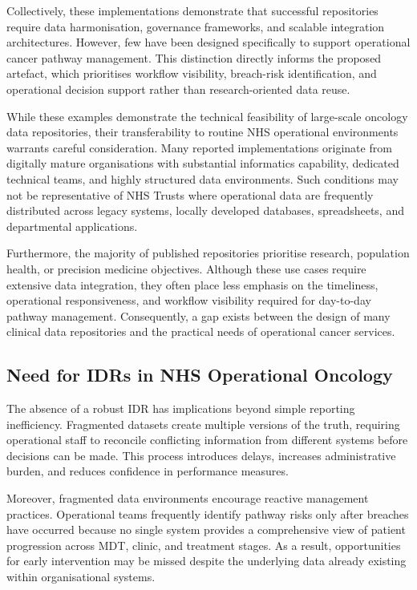 Collectively, these implementations demonstrate that successful repositories require data harmonisation, governance frameworks, and scalable integration architectures. However, few have been designed specifically to support operational cancer pathway management. This distinction directly informs the proposed artefact, which prioritises workflow visibility, breach-risk identification, and operational decision support rather than research-oriented data reuse.

While these examples demonstrate the technical feasibility of large-scale oncology data repositories, their transferability to routine NHS operational environments warrants careful consideration. Many reported implementations originate from digitally mature organisations with substantial informatics capability, dedicated technical teams, and highly structured data environments. Such conditions may not be representative of NHS Trusts where operational data are frequently distributed across legacy systems, locally developed databases, spreadsheets, and departmental applications.

Furthermore, the majority of published repositories prioritise research, population health, or precision medicine objectives. Although these use cases require extensive data integration, they often place less emphasis on the timeliness, operational responsiveness, and workflow visibility required for day-to-day pathway management. Consequently, a gap exists between the design of many clinical data repositories and the practical needs of operational cancer services.


\subsection{Need for IDRs in NHS Operational Oncology}

The absence of a robust IDR has implications beyond simple reporting inefficiency. Fragmented datasets create multiple versions of the truth, requiring operational staff to reconcile conflicting information from different systems before decisions can be made. This process introduces delays, increases administrative burden, and reduces confidence in performance measures.

Moreover, fragmented data environments encourage reactive management practices. Operational teams frequently identify pathway risks only after breaches have occurred because no single system provides a comprehensive view of patient progression across MDT, clinic, and treatment stages. As a result, opportunities for early intervention may be missed despite the underlying data already existing within organisational systems.

